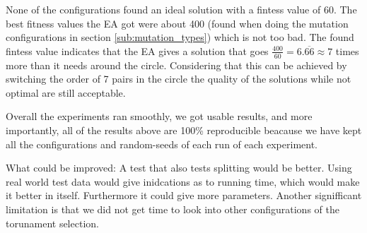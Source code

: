 None of the configurations found an ideal solution with a fintess value of 60. The best fitness values the EA got were about 400 (found when doing the mutation configurations in section \ref{sub:mutation_types}) which is not too bad. The found fintess value indicates that the EA gives a solution that goes $\frac{400}{60} = 6.\overline{66} \approx 7$ times more than it needs around the circle. Considering that this can be achieved by switching the order of 7 pairs in the circle the quality of the solutions while not optimal are still acceptable.

Overall the experiments ran smoothly, we got usable results, and more importantly, all of the results above are 100\% reproducible beacause we have kept all the configurations and random-seeds of each run of each experiment.

What could be improved: A test that also tests splitting would be better. Using real world test data would give inidcations as to running time, which would make it better in itself. Furthermore it could give more parameters. Another signifficant limitation is that we did not get time to look into other configurations of the torunament selection.


\cleardoublepage